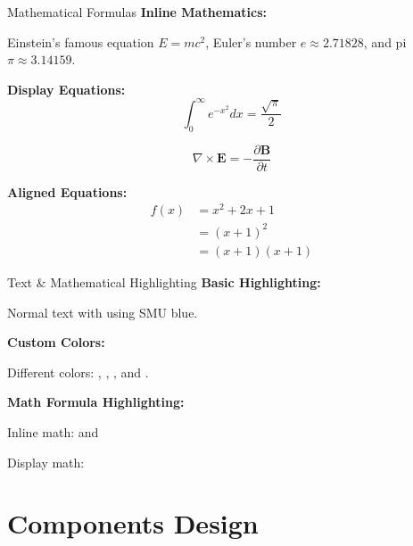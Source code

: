 \documentclass[10pt,aspectratio=1610]{beamer}
\begin{document}
\begin{frame}{Mathematical Formulas}
    \textbf{Inline Mathematics:}
    
    Einstein's famous equation $E = mc^2$, Euler's number $e \approx 2.71828$, and pi $\pi \approx 3.14159$.
    
    \vspace{1em}
    
    \textbf{Display Equations:}
    \[ \int_0^\infty e^{-x^2} dx = \frac{\sqrt{\pi}}{2} \]
    
    \[ \nabla \times \mathbf{E} = -\frac{\partial \mathbf{B}}{\partial t} \]
    
    \vspace{0.5em}
    
    \textbf{Aligned Equations:}
    \begin{align*}
        f(x) &= x^2 + 2x + 1 \\
             &= (x + 1)^2 \\
             &= (x + 1)(x + 1)
    \end{align*}
\end{frame}

\begin{frame}{Text \& Mathematical Highlighting}
    \textbf{Basic Highlighting:}
    
    Normal text with  using SMU blue.
    
    \vspace{0.5em}
    
    \textbf{Custom Colors:}
    
    Different colors: , 
    , 
    , and 
    .
    
    \vspace{1em}
    
    \textbf{Math Formula Highlighting:}
    
    Inline math:  and 
    
    \vspace{0.5em}
    
    Display math: 
\end{frame}

\section{Components Design}
\end{document}
